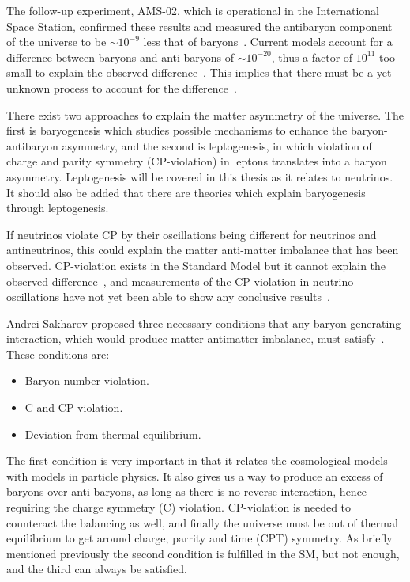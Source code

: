 The follow-up experiment, AMS-02, which is operational in the International Space Station, confirmed these results and measured the antibaryon component of the universe to be $\sim 10^{-9}$ less that of baryons~\cite{16AMS2}. Current models account for a difference between baryons and anti-baryons of $\sim 10^{-20}$, thus a factor of $10^{11}$ too small to explain the observed difference~\cite{49Matter}. This implies that there must be a yet unknown process to account for the difference~\cite{105Fukugita}.

There exist two approaches to explain the matter asymmetry of the universe. The first is baryogenesis which studies possible mechanisms to enhance the baryon-antibaryon asymmetry, and the second is leptogenesis, in which violation of charge and parity symmetry (CP-violation) in leptons translates into a baryon asymmetry. Leptogenesis will be covered in this thesis as it relates to neutrinos. It should also be added that there are theories which explain baryogenesis through leptogenesis.

If neutrinos violate CP by their oscillations being different for neutrinos and antineutrinos, this could explain the matter anti-matter imbalance that has been observed. CP-violation exists in the Standard Model but it cannot explain the observed difference~\cite{3Peskin}, and measurements of the CP-violation in neutrino oscillations have not yet been able to show any conclusive results~\cite{17Gonzalez}.

Andrei Sakharov proposed three necessary conditions that any baryon-generating interaction, which would produce matter antimatter imbalance, must satisfy~\cite{37Sakharov}. These conditions are:
\begin{itemize}
\item Baryon number violation.
\item C-and CP-violation. %
\item Deviation from thermal equilibrium.
\end{itemize}

The first condition is very important in that it relates the cosmological models with models in particle physics. It also gives us a way to produce an excess of baryons over anti-baryons, as long as there is no reverse interaction, hence requiring the charge symmetry (C) violation. CP-violation is needed to counteract the balancing as well, and finally the universe must be out of thermal equilibrium to get around charge, parrity and time (CPT) symmetry. As briefly mentioned previously the second condition is fulfilled in the SM, but not enough, and the third can always be satisfied.

